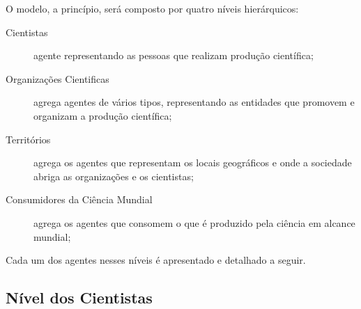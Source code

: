 O modelo, a princípio, será composto por quatro níveis hierárquicos:
\begin{description}
    \item [Cientistas] agente representando as pessoas que realizam produção científica;
    \item [Organizações Cientificas] agrega agentes de vários tipos, representando as entidades que promovem e organizam a produção científica;
    \item [Territórios] agrega os agentes que representam os locais geográficos e onde a sociedade abriga as organizações e os cientistas;
    \item [Consumidores da Ciência Mundial] agrega os agentes que consomem o que é produzido pela ciência em alcance mundial;  
\end{description}

Cada um dos agentes nesses níveis é apresentado e detalhado a seguir.

\subsection{Nível dos Cientistas}

